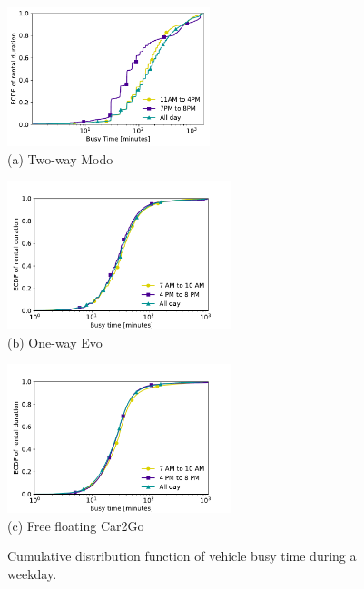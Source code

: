 \begin{figure}[htb]
\centering
    \begin{minipage}[b]{0.45\linewidth}
    \centering
     \includegraphics[width=59mm]{modo_cdfs/modo_tarde_noiteCDF_rebuttal.pdf}
     {\\(a) Two-way Modo}
    \end{minipage}
    \hspace{5mm}
    \begin{minipage}[b]{0.45\linewidth}
     \centering
     \includegraphics[width=65mm]{evo_cdfs/evo_tarde_noiteCDF_rebuttal.pdf}
     \vspace*{-3mm}
     {\\(b) One-way Evo}
    \end{minipage}
    \begin{minipage}[b]{0.45\linewidth}
    \vspace{5mm}
     \centering
     \includegraphics[width=65mm]{car2go_cdfs/c2g_tarde_noiteCDF_rebuttal.pdf}
     {\\(c) Free floating Car2Go}
    \end{minipage}
    \caption{Cumulative distribution function of vehicle busy time during a weekday.}
    \label{fig:cdfs_picos}
\end{figure}

